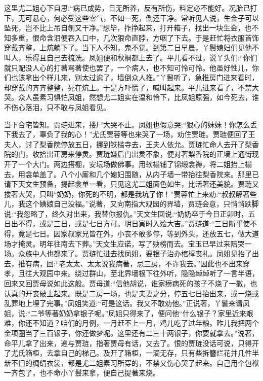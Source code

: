 \begin{parag}
    这里尤二姐心下自思:“病已成势，日无所养，反有所伤，料定必不能好。况胎已打下，无可悬心，何必受这些零气，不如一死，倒还干净。常听见人说，生金子可以坠死，岂不比上吊自刎又干净。”想毕，拃挣起来，打开箱子，找出一块生金，也不知多重，恨命含泪便吞入口中，几次狠命直脖，方咽了下去。于是赶忙将衣服首饰穿戴齐整，上炕躺下了。当下人不知，鬼不觉。到第二日早晨，丫鬟媳妇们见他不叫人，乐得且自己去梳洗。凤姐便和秋桐都上去了。平儿看不过，说丫头们:“你们就只配没人心的打著骂著使也罢了，一个病人，也不知可怜可怜。他虽好性儿，你们也该拿出个样儿来，别太过逾了，墙倒众人推。”丫鬟听了，急推房门进来看时，却穿戴的齐齐整整，死在炕上。于是方吓慌了，喊叫起来。平儿进来看了，不禁大哭。众人虽素习惧怕凤姐，然想尤二姐实在温和怜下，比凤姐原强，如今死去，谁不伤心落泪，只不敢与凤姐看见。
\end{parag}


\begin{parag}
    当下合宅皆知。贾琏进来，搂尸大哭不止。凤姐也假意哭:“狠心的妹妹！你怎么丢下我去了，辜负了我的心！”尤氏贾蓉等也来哭了一场，劝住贾琏。贾琏便回了王夫人，讨了梨香院停放五日，挪到铁槛寺去，王夫人依允。贾琏忙命人去开了梨香院的门，收拾出正房来停灵。贾琏嫌后门出灵不象，便对著梨香院的正墙上通街现开了一个大门。两边搭棚，安坛场做佛事。用软榻铺了锦缎衾褥，将二姐抬上榻去，用衾单盖了。八个小厮和几个媳妇围随，从内子墙一带抬往梨香院来。那里已请下天文生预备，揭起衾单一看，只见这尤二姐面色如生，比活著还美貌。贾琏又搂著大哭，只叫“奶奶，你死的不明，都是我坑了你！”贾蓉忙上来劝:“叔叔解著些儿，我这个姨娘自己没福。”说著，又向南指大观园的界墙，贾琏会意，只悄悄跌脚说:“我忽略了，终久对出来，我替你报仇。”天文生回说:“奶奶卒于今日正卯时，五日出不得，或是三日，或是七日方可。明日寅时入殓大吉。”贾琏道:“三日断乎使不得，竟是七日。因家叔家兄皆在外，小丧不敢多停，等到外头，还放五七，做大道场才掩灵。明年往南去下葬。”天文生应诺，写了殃榜而去。宝玉已早过来陪哭一场。众族中人也都来了。贾琏忙进去找凤姐，要银子治办棺椁丧礼。凤姐见抬了出去，推有病，回:“老太太、太太说我病著，忌三房，不许我去。”因此也不出来穿孝，且往大观园中来。绕过群山，至北界墙根下往外听，隐隐绰绰听了一言半语，回来又回贾母说如此这般。贾母道:“信他胡说，谁家痨病死的孩子不烧了一撒，也认真的开丧破土起来。既是二房一场，也是夫妻之分，停五七日抬出来，或一烧或乱葬地上埋了完事。”凤姐笑道:“可是这话。我又不敢劝他。”正说著，丫鬟来请凤姐，说:“二爷等著奶奶拿银子呢。”凤姐只得来了，便问他“什么银子？家里近来艰难，你还不知道？咱们的月例，一月赶不上一月，鸡儿吃了过年粮。昨儿我把两个金项圈当了三百银子，你还做梦呢。这里还有二三十两银子，你要就拿去。”说著，命平儿拿了出来，递与贾琏，指著贾母有话，又去了。恨的贾琏没话可说，只得开了尤氏箱柜，去拿自己的梯己。及开了箱柜，一滴无存，只有些拆簪烂花并几件半新不旧的绸绢衣裳，都是尤二姐素习所穿的，不禁又伤心哭了起来。自己用个包袱一齐包了，也不命小丫鬟来拿，便自己提著来烧。
\end{parag}


